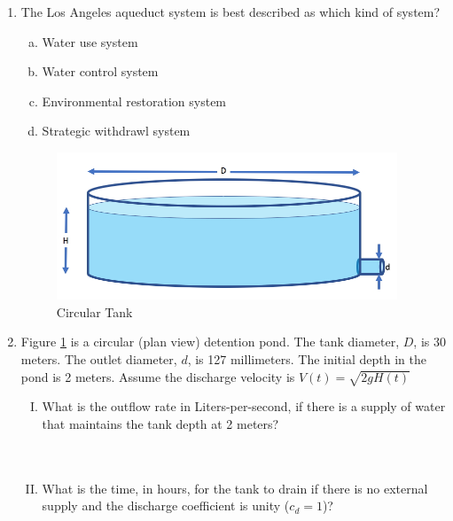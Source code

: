 \documentclass[11pt]{article}
\begin{document}
\begin{enumerate}
\item The Los Angeles aqueduct system is best described as which kind of system?
\begin{enumerate}[(a)]
\item Water use system
\item Water control system
\item Environmental restoration system
\item Strategic withdrawl system
\end{enumerate}
\clearpage

\begin{figure}[h!] %
   \centering
   \includegraphics[width=4in]{Tank.jpg} 
   \caption{Circular Tank}
   \label{fig:Tank}
\end{figure}
\item Figure \ref{fig:Tank} is a circular (plan view) detention pond. 
The tank diameter, $D$, is 30 meters. 
The outlet diameter, $d$, is 127 millimeters.   
The initial depth in the pond is 2 meters.
Assume the discharge velocity is $V(t)=\sqrt{2gH(t)}$
\begin{enumerate}[(I)]
\item What is the outflow rate in Liters-per-second, if there is a supply of water that maintains the tank depth at 2 meters?
~\\~\\~\\
\item What is the time, in hours, for the tank to drain if there is no external supply and the discharge coefficient is unity ($c_d = 1$)?

\end{enumerate}



\end{enumerate}
\end{document}

